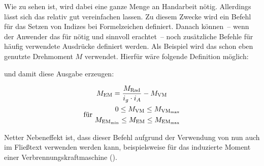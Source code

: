 \documentclass[english,ngerman]{tudscrartcl}
\begin{document}
%
Wie zu sehen ist, wird dabei eine ganze Menge an Handarbeit nötig. Allerdings 
lässt sich das relativ gut vereinfachen lassen. Zu diesem Zwecke wird ein 
Befehl \PParameter{\dots} für das Setzen von Indizes bei 
Formelzeichen definiert. Danach können~-- wenn der Anwender das für nötig und 
sinnvoll erachtet~-- noch zusätzliche Befehle für häufig verwendete Ausdrücke 
definiert werden. Als Beispiel wird das schon eben genutzte Drehmoment 
\ensuremath{M} verwendet. Hierfür wäre folgende Definition möglich:
%
\CodeHook{\let\newcommand\renewcommand}
\begin{Trunk*}
\newcommand*{\ind}[1]{\ensuremath{_\mathrm{#1}}}
\newcommand*{\M}[1]{\ensuremath{M\ind{#1}}}

\end{Trunk*}
%
und damit diese Ausgabe erzeugen:
%
\begin{Trunk*}
\begin{equation*}
\begin{gathered}
\M{EM} = \frac{\M{Rad}}{i_g \cdot i_A} - \M{VM} \\
\textrm{für }
\begin{aligned}
0\leq \M{VM}\leq \M{VM_{max}} \\ 
\M{EM_{min}}\leq \M{EM}\leq \M{EM_{max}}
\end{aligned}
\end{gathered}
\end{equation*}

\end{Trunk*}
%
Netter Nebeneffekt ist, dass dieser Befehl aufgrund der Verwendung von 
\PParameter{\dots} nun auch im Fließtext verwenden werden 
kann, beispielsweise für das induzierte Moment einer Verbrennungskraftmaschine 
 ().
\end{document}

